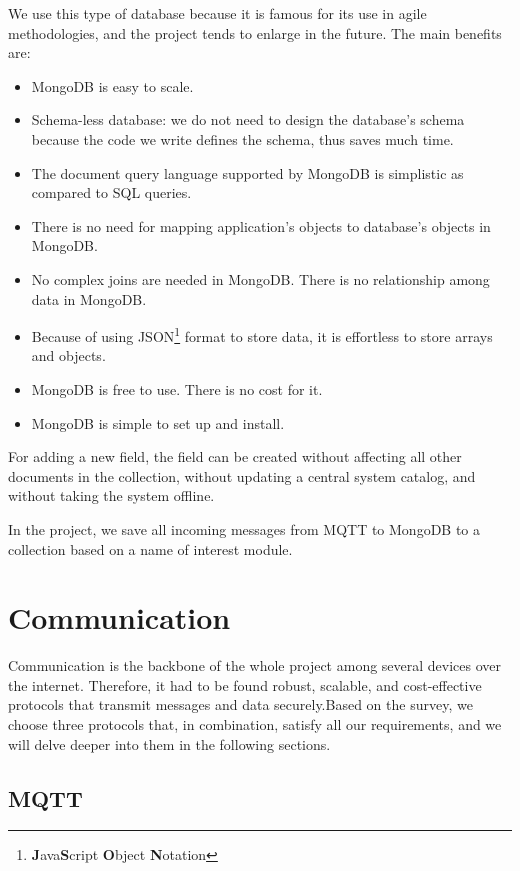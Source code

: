 We use this type of database because it is famous for its use in agile methodologies, and the project tends to enlarge in the future. The main benefits are:
\begin{itemize}
	\item MongoDB is easy to scale.
	\item Schema-less database: we do not need to design the database's schema because the code we write defines the schema, thus saves much time.
	\item The document query language supported by MongoDB is simplistic as compared to SQL queries.
	\item There is no need for mapping application's objects to database's objects in MongoDB.
	\item No complex joins are needed in MongoDB. There is no relationship among data in MongoDB.
	\item Because of using JSON\footnote{\textbf{J}ava\textbf{S}cript \textbf{O}bject \textbf{N}otation} format to store data, it is effortless to store arrays and objects.
	\item MongoDB is free to use. There is no cost for it.
	\item MongoDB is simple to set up and install.
\end{itemize}

For adding a new field, the field can be created without affecting all other documents in the collection, without updating a central system catalog, and without taking the system offline. 

In the project, we save all incoming messages from MQTT to MongoDB to a collection based on a name of interest module.

\section{Communication}

Communication is the backbone of the whole project among several devices over the internet. Therefore, it had to be found robust, scalable, and cost-effective protocols that transmit messages and data securely.Based on the survey, we choose three protocols that, in combination, satisfy all our requirements, and we will delve deeper into them in the following sections.

\subsection{MQTT}

